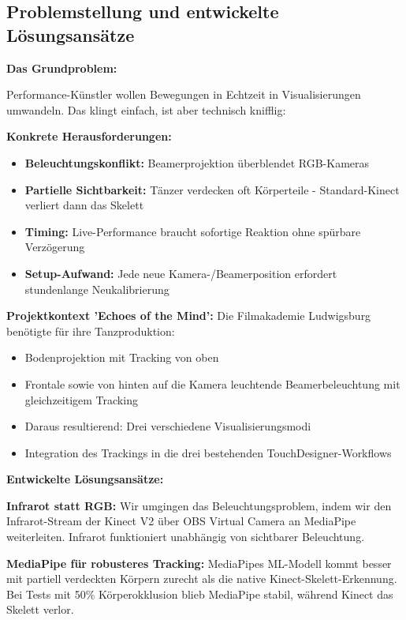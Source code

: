\subsection{Problemstellung und entwickelte Lösungsansätze}

\textbf{Das Grundproblem:}

Performance-Künstler wollen Bewegungen in Echtzeit in Visualisierungen umwandeln. Das klingt einfach, ist aber technisch knifflig: 

\textbf{Konkrete Herausforderungen:}
\begin{itemize}
    \item \textbf{Beleuchtungskonflikt:} Beamerprojektion überblendet RGB-Kameras
    \item \textbf{Partielle Sichtbarkeit:} Tänzer verdecken oft Körperteile - Standard-Kinect verliert dann das Skelett
    \item \textbf{Timing:} Live-Performance braucht sofortige Reaktion ohne spürbare Verzögerung
    \item \textbf{Setup-Aufwand:} Jede neue Kamera-/Beamerposition erfordert stundenlange Neukalibrierung
\end{itemize}



\textbf{Projektkontext 'Echoes of the Mind':}
Die Filmakademie Ludwigsburg benötigte für ihre Tanzproduktion:
\begin{itemize}
    \item Bodenprojektion mit Tracking von oben
    \item Frontale sowie von hinten auf die Kamera leuchtende Beamerbeleuchtung mit gleichzeitigem Tracking
    \item Daraus resultierend: Drei verschiedene Visualisierungsmodi
    \item Integration des Trackings in die drei bestehenden TouchDesigner-Workflows
\end{itemize}

\textbf{Entwickelte Lösungsansätze:}

\textbf{Infrarot statt RGB:}
Wir umgingen das Beleuchtungsproblem, indem wir den Infrarot-Stream der Kinect V2 über OBS Virtual Camera an MediaPipe weiterleiten. Infrarot funktioniert unabhängig von sichtbarer Beleuchtung.

\textbf{MediaPipe für robusteres Tracking:}
MediaPipes ML-Modell kommt besser mit partiell verdeckten Körpern zurecht als die native Kinect-Skelett-Erkennung. Bei Tests mit 50\% Körperokklusion blieb MediaPipe stabil, während Kinect das Skelett verlor.

